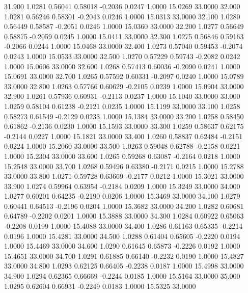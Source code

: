   31.900   1.0281   0.56041   0.58018  -0.2036   0.0247   1.0000  15.0269  33.0000
  32.000   1.0281   0.56246   0.58301  -0.2043   0.0246   1.0000  15.0313  33.0000
  32.100   1.0280   0.56449   0.58587  -0.2051   0.0246   1.0000  15.0360  33.0000
  32.200   1.0277   0.56649   0.58875  -0.2059   0.0245   1.0000  15.0411  33.0000
  32.300   1.0275   0.56846   0.59163  -0.2066   0.0244   1.0000  15.0468  33.0000
  32.400   1.0273   0.57040   0.59453  -0.2074   0.0243   1.0000  15.0533  33.0000
  32.500   1.0270   0.57229   0.59743  -0.2082   0.0242   1.0000  15.0606  33.0000
  32.600   1.0268   0.57413   0.60036  -0.2090   0.0241   1.0000  15.0691  33.0000
  32.700   1.0265   0.57592   0.60331  -0.2097   0.0240   1.0000  15.0789  33.0000
  32.800   1.0263   0.57766   0.60629  -0.2105   0.0239   1.0000  15.0904  33.0000
  32.900   1.0261   0.57936   0.60931  -0.2113   0.0237   1.0000  15.1040  33.0000
  33.000   1.0259   0.58104   0.61238  -0.2121   0.0235   1.0000  15.1199  33.0000
  33.100   1.0258   0.58273   0.61549  -0.2129   0.0233   1.0000  15.1384  33.0000
  33.200   1.0258   0.58450   0.61862  -0.2136   0.0230   1.0000  15.1593  33.0000
  33.300   1.0259   0.58637   0.62175  -0.2144   0.0227   1.0000  15.1821  33.0000
  33.400   1.0260   0.58837   0.62484  -0.2151   0.0224   1.0000  15.2060  33.0000
  33.500   1.0263   0.59048   0.62788  -0.2158   0.0221   1.0000  15.2304  33.0000
  33.600   1.0265   0.59268   0.63087  -0.2164   0.0218   1.0000  15.2548  33.0000
  33.700   1.0268   0.59496   0.63380  -0.2171   0.0215   1.0000  15.2788  33.0000
  33.800   1.0271   0.59728   0.63669  -0.2177   0.0212   1.0000  15.3021  33.0000
  33.900   1.0274   0.59964   0.63954  -0.2184   0.0209   1.0000  15.3249  33.0000
  34.000   1.0277   0.60201   0.64235  -0.2190   0.0206   1.0000  15.3469  33.0000
  34.100   1.0279   0.60441   0.64513  -0.2196   0.0204   1.0000  15.3682  33.0000
  34.200   1.0282   0.60681   0.64789  -0.2202   0.0201   1.0000  15.3888  33.0000
  34.300   1.0284   0.60922   0.65063  -0.2208   0.0199   1.0000  15.4088  33.0000
  34.400   1.0286   0.61163   0.65335  -0.2214   0.0196   1.0000  15.4281  33.0000
  34.500   1.0288   0.61404   0.65605  -0.2220   0.0194   1.0000  15.4469  33.0000
  34.600   1.0290   0.61645   0.65873  -0.2226   0.0192   1.0000  15.4651  33.0000
  34.700   1.0291   0.61885   0.66140  -0.2232   0.0190   1.0000  15.4827  33.0000
  34.800   1.0293   0.62125   0.66405  -0.2238   0.0187   1.0000  15.4998  33.0000
  34.900   1.0294   0.62365   0.66669  -0.2244   0.0185   1.0000  15.5164  33.0000
  35.000   1.0295   0.62604   0.66931  -0.2249   0.0183   1.0000  15.5325  33.0000
